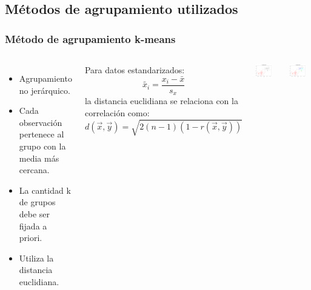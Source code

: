 \documentclass[serif,9pt, t]{beamer}
\begin{document}
\subsection{Métodos de agrupamiento utilizados}
\begin{frame}\frametitle{Método de agrupamiento k-means} 
\begin{columns}[T]
	\begin{itemize}
	\item Agrupamiento no jerárquico.
	\item Cada observación pertenece al grupo con la media más cercana.
	\item La cantidad k de grupos debe ser fijada a priori.
	\item Utiliza la distancia euclidiana.
	\end{itemize}
	Para datos estandarizados:
	\begin{equation}
		\tilde{x_i} = \frac{x_i-\bar{x}}{s_x}
	\end{equation}	
	la distancia euclidiana se relaciona con la correlación como:
	\begin{equation}
		d(\vec{x}, \vec{y}) = \sqrt{2(n-1)(1-r(\vec{x}, \vec{y}))}
	\end{equation}

	\centering	
	\includegraphics[width=0.8\textwidth]{ejemplo_kmeans_k2.pdf}
	
	\centering	
	\includegraphics[width=0.8\textwidth]{ejemplo_kmeans_k5.pdf}	
\end{columns}
\end{frame}
\end{document}
